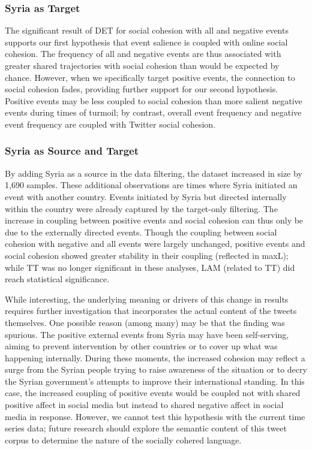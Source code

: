 \documentclass[english,man]{apa6}
\begin{document}
\hypertarget{syria-as-target-2}{%
\subsubsection{Syria as Target}\label{syria-as-target-2}}

The significant result of DET for social cohesion with all and negative events
supports our first hypothesis that event salience is coupled with online social
cohesion. The frequency of all and negative events are thus associated with
greater shared trajectories with social cohesion than would be expected by
chance. However, when we specifically target positive events, the connection to
social cohesion fades, providing further support for our second hypothesis.
Positive events may be less coupled to social cohesion than more salient
negative events during times of turmoil; by contrast, overall event frequency
and negative event frequency are coupled with Twitter social cohesion.

\hypertarget{syria-as-source-and-target-2}{%
\subsubsection{Syria as Source and Target}\label{syria-as-source-and-target-2}}

By adding Syria as a source in the data filtering, the dataset increased in size
by 1,690 samples. These additional observations are times where Syria initiated
an event with another country. Events initiated by Syria but directed internally
within the country were already captured by the target-only filtering. The
increase in coupling between positive events and social cohesion can thus only
be due to the externally directed events. Though the coupling between social
cohesion with negative and all events were largely unchanged, positive events
and social cohesion showed greater stability in their coupling (reflected in
maxL); while TT was no longer significant in these analyses, LAM (related to TT)
did reach statistical significance.

While interesting, the underlying meaning or drivers of this change in results
requires further investigation that incorporates the actual content of the
tweets themselves. One possible reason (among many) may be that the finding was
spurious. The positive external events from Syria may have been self-serving,
aiming to prevent intervention by other countries or to cover up what was
happening internally. During these moments, the increased cohesion may reflect a
surge from the Syrian people trying to raise awareness of the situation or to
decry the Syrian government's attempts to improve their international standing.
In this case, the increased coupling of positive events would be coupled not
with shared positive affect in social media but instead to shared negative
affect in social media in response. However, we cannot test this hypothesis with
the current time series data; future research should explore the semantic
content of this tweet corpus to determine the nature of the socially cohered
language.
\end{document}
